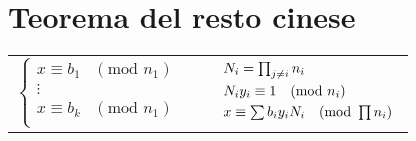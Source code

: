 \section{Teorema del resto cinese}
\begin{tabular}{@{}l@{}l@{}}
$\left\{
\begin{array}{ll}
x \equiv b_1 &(\text{mod } n_1) \\
\vdots \\
x \equiv b_k &(\text{mod } n_1) \\
\end{array}
\right.$ &
$\begin{array}{l}
\vspace{1.2mm}\hspace{5mm}
N_i = \prod_{j \neq i} n_i \\
\vspace{1mm}\hspace{5mm}
N_i y_i \equiv 1 \quad (\text{mod } n_i) \\
\vspace{1mm}\hspace{5mm}
x \equiv \sum b_i y_i N_i \quad (\text{mod } \prod n_i)\\
\end{array}$
\end{tabular}
